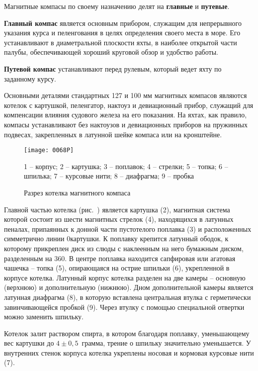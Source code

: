 Магнитные компасы по своему назначению делят на \textbf{главные} и \textbf{путевые}. 

\textbf{Главный компас} является основным прибором, служащим для непрерывного указания курса и пеленгования в целях определения своего места в море. Его устанавливают в диаметральной плоскости яхты, в наиболее открытой части палубы, обеспечивающей хороший круговой обзор и удобство работы. 

\textbf{Путевой компас} устанавливают перед рулевым, который ведет яхту по заданному курсу. 

Основными деталями стандартных 127 и 100 мм магнитных компасов являются котелок с картушкой, пеленгатор, нактоуз и девиационный прибор, служащий для компенсации влияния судового железа на его показания. На яхтах, как правило, компасы устанавливают без нактоузов и девиационных приборов на пружинных подвесах, закрепленных в латунной шейке компаса или на кронштейне. 

\begin{figure}[htb]
  \centering{}
  \texttt{[image: 0068P]}
  \caption{Разрез котелка магнитного компаса}
  \label{fig:N68}
  \small
  \centering{}
  1 \--- корпус; 2 \--- картушка; 3 \--- поплавок; 4 \--- стрелки; 5 \--- топка; 6 \--- шпилька; 7 \--- курсовые нити; 8 \--- диафрагма; 9 \--- пробка
\end{figure} 

Главной частью котелка (рис.~) является картушка (2), магнитная система которой состоит из шести магнитных стрелок (4), находящихся в латунных пеналах, припаянных к донной части пустотелого поплавка (3) и расположенных симметрично линии 0\gr картушки. К поплавку крепится латунный ободок, к которому прикреплен диск из слюды с наклеенным на него бумажным диском, разделенным на 360\gr. В центре поплавка находится сапфировая или агатовая чашечка \--- топка (5), опирающаяся на острие шпильки (6), укрепленной в корпусе котелка. Латунный корпус котелка разделен на две камеры \--- основную (верхнюю) и дополнительную (нижнюю). Дном дополнительной камеры является латунная диафрагма (8), в которую вставлена центральная втулка с герметически завинчивающейся пробкой (9). Через втулку с помощью специальной отвертки можно заменить шпильку. 

Котелок залит раствором спирта, в котором благодаря поплавку, уменьшающему вес картушки до $4 \pm 0,5$~грамма, трение о шпильку значительно уменьшается. У внутренних стенок корпуса котелка укреплены носовая и кормовая курсовые нити (7).

